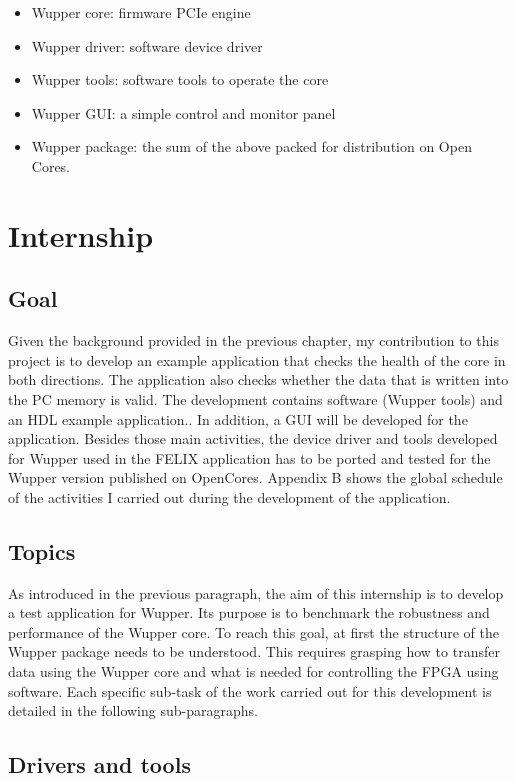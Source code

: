 \begin{itemize}
 \item Wupper core: firmware PCIe engine
 \item Wupper driver: software device driver
 \item Wupper tools: software tools to operate the core
 \item Wupper GUI: a simple control and monitor panel
 \item Wupper package: the sum of the above packed for distribution on Open Cores.
\end{itemize}


\newpage
\section{Internship}

\subsection {Goal}
Given the background provided in the previous chapter, my contribution to this project is to develop an example application that checks the health of the core in both directions. The application also checks whether the data that is written into the PC memory is valid. The development contains software (Wupper tools) and an HDL example application.. In addition, a GUI will be developed for the application. Besides those main activities, the device driver and tools developed for Wupper used in the FELIX application has to be ported and tested for the Wupper version published on OpenCores. Appendix B shows the global schedule of the activities I carried out during the development of the application.

\subsection {Topics}
As introduced in the previous paragraph, the aim of this internship is to develop a test application for Wupper. Its purpose is to benchmark the robustness and performance of the Wupper core.
To reach this goal, at first the structure of the Wupper package needs to be understood. This requires grasping how to transfer data using the Wupper core and what is needed for controlling the FPGA using software. Each specific sub-task of the work carried out for this development is detailed in the following sub-paragraphs.


\subsection {Drivers and tools}

